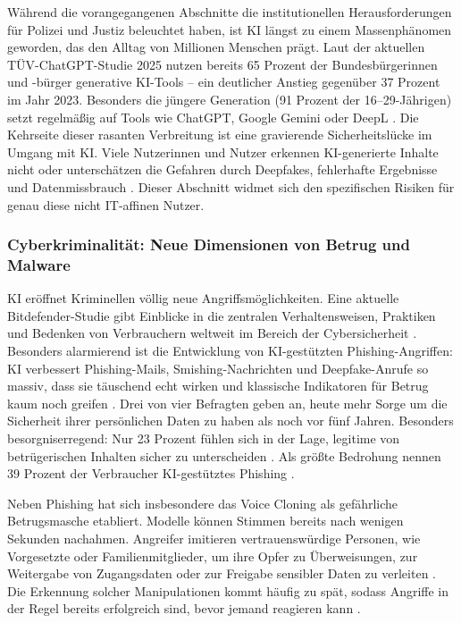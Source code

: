\documentclass[12pt,a4paper]{article}
\begin{document}
	Während die vorangegangenen Abschnitte die institutionellen Herausforderungen für Polizei und Justiz beleuchtet haben, ist KI längst zu einem Massenphänomen geworden, das den Alltag von Millionen Menschen prägt. Laut der aktuellen TÜV-ChatGPT-Studie 2025 nutzen bereits 65 Prozent der Bundesbürgerinnen und -bürger generative KI-Tools – ein deutlicher Anstieg gegenüber 37 Prozent im Jahr 2023. Besonders die jüngere Generation (91 Prozent der 16–29-Jährigen) setzt regelmäßig auf Tools wie ChatGPT, Google Gemini oder DeepL \cite{TUEV2025}. Die Kehrseite dieser rasanten Verbreitung ist eine gravierende Sicherheitslücke im Umgang mit KI. Viele Nutzerinnen und Nutzer erkennen KI-generierte Inhalte nicht oder unterschätzen die Gefahren durch Deepfakes, fehlerhafte Ergebnisse und Datenmissbrauch \cite{TUEV2025}. Dieser Abschnitt widmet sich den spezifischen Risiken für genau diese nicht IT-affinen Nutzer.
	
	\subsubsection{Cyberkriminalität: Neue Dimensionen von Betrug und Malware}
	
	KI eröffnet Kriminellen völlig neue Angriffsmöglichkeiten. Eine aktuelle Bitdefender-Studie gibt Einblicke in die zentralen Verhaltensweisen, Praktiken und Bedenken von Verbrauchern weltweit im Bereich der Cybersicherheit \cite{Bitdefender2025}. Besonders alarmierend ist die Entwicklung von KI-gestützten Phishing-Angriffen: KI verbessert Phishing-Mails, Smishing-Nachrichten und Deepfake-Anrufe so massiv, dass sie täuschend echt wirken und klassische Indikatoren für Betrug kaum noch greifen \cite{SecurityInsider2025a}. Drei von vier Befragten geben an, heute mehr Sorge um die Sicherheit ihrer persönlichen Daten zu haben als noch vor fünf Jahren. Besonders besorgniserregend: Nur 23 Prozent fühlen sich in der Lage, legitime von betrügerischen Inhalten sicher zu unterscheiden \cite{SecurityInsider2025b}. Als größte Bedrohung nennen 39 Prozent der Verbraucher KI-gestütztes Phishing \cite{SecurityInsider2025b}.
	
	Neben Phishing hat sich insbesondere das Voice Cloning als gefährliche Betrugsmasche etabliert. Modelle können Stimmen bereits nach wenigen Sekunden nachahmen. Angreifer imitieren vertrauenswürdige Personen, wie Vorgesetzte oder Familienmitglieder, um ihre Opfer zu Überweisungen, zur Weitergabe von Zugangsdaten oder zur Freigabe sensibler Daten zu verleiten \cite{Watchguard2025}. Die Erkennung solcher Manipulationen kommt häufig zu spät, sodass Angriffe in der Regel bereits erfolgreich sind, bevor jemand reagieren kann \cite{Watchguard2025}.
	
\end{document}
